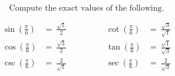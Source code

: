 $$
\text{Compute the exact values of the following.}
$$

$$
\begin{align*}
  \sin\left(\frac{\pi}{6}\right) &=\ \frac{\sqrt{1}}{2} \qquad&\qquad \cot\left(\frac{\pi}{6}\right) &=\ \frac{\sqrt{3}}{\sqrt{1}} \\[2ex]
  \cos\left(\frac{\pi}{6}\right) &=\ \frac{\sqrt{3}}{2} \qquad&\qquad \tan\left(\frac{\pi}{6}\right) &=\ \frac{\sqrt{1}}{\sqrt{3}} \\[2ex]
  \csc\left(\frac{\pi}{6}\right) &=\ \frac{2}{\sqrt{1}} \qquad&\qquad \sec\left(\frac{\pi}{6}\right) &=\ \frac{2}{\sqrt{3}}
\end{align*}
$$
